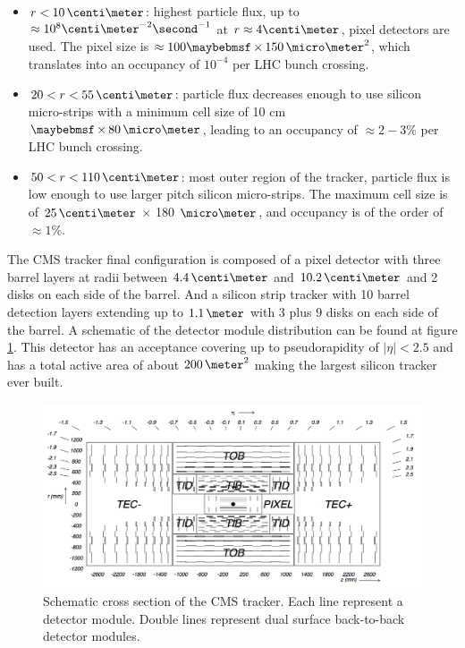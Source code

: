 \begin{itemize}
  \item $r<10\,\centi\meter$: highest particle flux, up to $\approx 10^8 \centi\meter^{-2}\second^{-1}$ at $r \approx 4 \centi\meter$, pixel detectors are used. The pixel size is $\approx 100 \times 150\,\micro\meter^2$, which translates into an occupancy of $10^{-4}$ per \gls{LHC} bunch crossing.
  \item $20<r<55\,\centi\meter$: particle flux decreases enough to use silicon micro-strips with a minimum cell size of 10 cm $\times 80\,\micro\meter$, leading to an occupancy of $\approx 2-3\%$ per \gls{LHC} bunch crossing.
  \item $50<r<110\,\centi\meter$: most outer region of the tracker, particle flux is low enough to use larger pitch silicon micro-strips. The maximum cell size is of $25\,\centi\meter$ $\times$ 180 $\micro\meter$, and occupancy is of the order of $\approx 1\%$.
\end{itemize}

The \gls{CMS} tracker final configuration is composed of a pixel detector with three barrel layers at radii between $4.4\,\centi\meter$ and $10.2\,\centi\meter$ and 2 disks on each side of the barrel. And a silicon strip tracker with 10 barrel detection layers extending up to $1.1\,\meter$ with 3 plus 9 disks on each side of the barrel. A schematic of the detector module distribution can be found at figure \ref{FIGURE:ExperimentalApparatus_CMS_Tracker_Layout}. This detector has an acceptance covering up to pseudorapidity of $|\eta|<2.5$ and has a total active area of about $200\,\meter^2$ making the largest silicon tracker ever built. 

\begin{figure}[!htb]
  \centering
  \includegraphics[width=1.0\textwidth]{Chapter02/CMS/Images/CMS_Tracker_Layout.png}
  \caption{Schematic cross section of the CMS tracker. Each line represent a detector module. Double lines represent dual surface back-to-back detector modules.}
  \label{FIGURE:ExperimentalApparatus_CMS_Tracker_Layout}
\end{figure}


